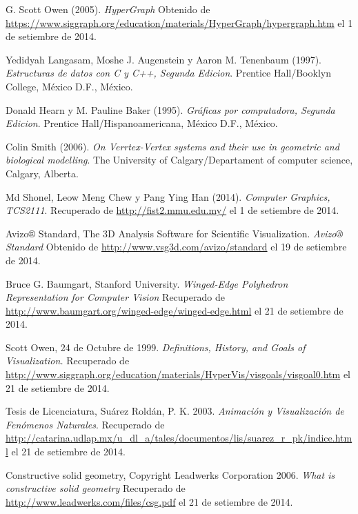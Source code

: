 \documentclass[11pt,letterpaper]{article}     %
\begin{document}
\begin{thebibliography}{5}
 G. Scott Owen (2005). \textit{HyperGraph} Obtenido de \url{https://www.siggraph.org/education/materials/HyperGraph/hypergraph.htm}  el 1 de setiembre de 2014.

 Yedidyah Langasam, Moshe J. Augenstein y Aaron M. Tenenbaum (1997). \textit{Estructuras de datos con C y C++, Segunda Edicion}. Prentice Hall/Booklyn College, México D.F., México.

 Donald Hearn y M. Pauline Baker (1995). \textit{Gr\' aficas por computadora, Segunda Edicion}. Prentice Hall/Hispanoamericana, México D.F., México.

 Colin Smith (2006). \textit{On Verrtex-Vertex systems and their use in geometric and biological modelling}. The University of Calgary/Departament of computer science, Calgary, Alberta.

 Md Shonel, Leow Meng Chew y Pang Ying Han (2014). \textit{Computer Graphics, TCS2111}. Recuperado de \url{http://fist2.mmu.edu.my/} el 1 de setiembre de 2014.

 Avizo® Standard, The 3D Analysis Software for Scientific Visualization. \textit{Avizo® Standard} Obtenido de \url{http://www.vsg3d.com/avizo/standard} el 19 de setiembre de 2014.

 Bruce G. Baumgart, Stanford University. \textit{Winged-Edge Polyhedron Representation for Computer Vision}
Recuperado de \url{http://www.baumgart.org/winged-edge/winged-edge.html} el 21 de setiembre de 2014.

 Scott Owen, 24 de Octubre de 1999. \textit{Definitions, History, and Goals of Visualization.} Recuperado de \url{http://www.siggraph.org/education/materials/HyperVis/visgoals/visgoal0.htm} el 21 de setiembre de 2014.

 Tesis de Licenciatura, Su\' arez Rold\' an, P. K. 2003. \textit{Animaci\' on y Visualizaci\' on de Fen\' omenos Naturales}. Recuperado de  \url{http://catarina.udlap.mx/u_dl_a/tales/documentos/lis/suarez_r_pk/indice.html} el 21 de setiembre de 2014.

 Constructive solid geometry, Copyright Leadwerks Corporation 2006. \textit{What is constructive solid geometry} Recuperado de \url{http://www.leadwerks.com/files/csg.pdf} el 21 de setiembre de 2014.


\end{thebibliography}
\end{document}
